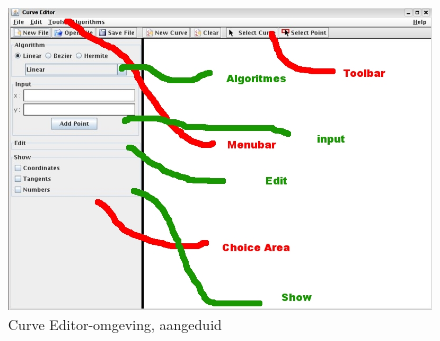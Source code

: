 \documentclass[a4paper,11pt,oneside, titlepage]{article}
\begin{document}
\begin{figure}[htbp]
\centering
\includegraphics[scale=0.4]{./screenies/startMarked.jpg}
\caption{Curve Editor-omgeving, aangeduid}\label{scrTot}
\end{figure}
\newpage
\end{document}
